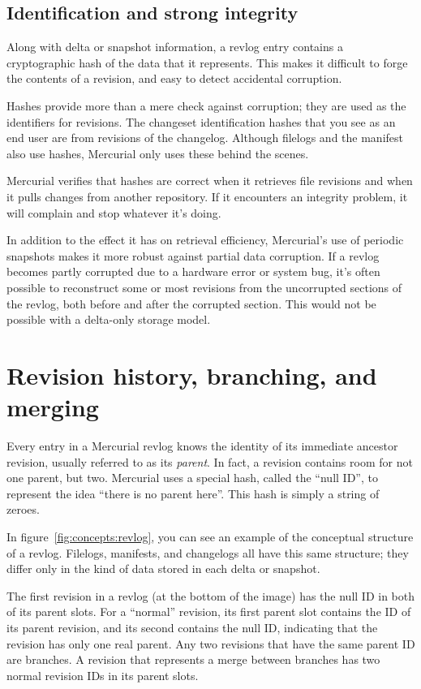 \subsection{Identification and strong integrity}

Along with delta or snapshot information, a revlog entry contains a
cryptographic hash of the data that it represents.  This makes it
difficult to forge the contents of a revision, and easy to detect
accidental corruption.  

Hashes provide more than a mere check against corruption; they are
used as the identifiers for revisions.  The changeset identification
hashes that you see as an end user are from revisions of the
changelog.  Although filelogs and the manifest also use hashes,
Mercurial only uses these behind the scenes.

Mercurial verifies that hashes are correct when it retrieves file
revisions and when it pulls changes from another repository.  If it
encounters an integrity problem, it will complain and stop whatever
it's doing.

In addition to the effect it has on retrieval efficiency, Mercurial's
use of periodic snapshots makes it more robust against partial data
corruption.  If a revlog becomes partly corrupted due to a hardware
error or system bug, it's often possible to reconstruct some or most
revisions from the uncorrupted sections of the revlog, both before and
after the corrupted section.  This would not be possible with a
delta-only storage model.

\section{Revision history, branching,
  and merging}

Every entry in a Mercurial revlog knows the identity of its immediate
ancestor revision, usually referred to as its \emph{parent}.  In fact,
a revision contains room for not one parent, but two.  Mercurial uses
a special hash, called the ``null ID'', to represent the idea ``there
is no parent here''.  This hash is simply a string of zeroes.

In figure~\ref{fig:concepts:revlog}, you can see an example of the
conceptual structure of a revlog.  Filelogs, manifests, and changelogs
all have this same structure; they differ only in the kind of data
stored in each delta or snapshot.

The first revision in a revlog (at the bottom of the image) has the
null ID in both of its parent slots.  For a ``normal'' revision, its
first parent slot contains the ID of its parent revision, and its
second contains the null ID, indicating that the revision has only one
real parent.  Any two revisions that have the same parent ID are
branches.  A revision that represents a merge between branches has two
normal revision IDs in its parent slots.

